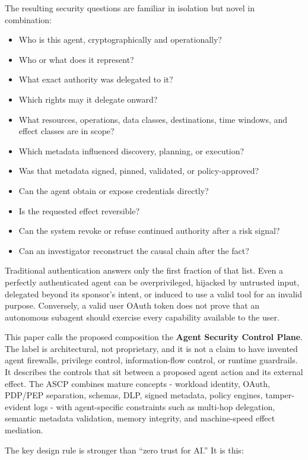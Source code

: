 \documentclass[
  10pt,
  letterpaper,
]{article}
\providecommand{\tightlist}{%
  \setlength{\itemsep}{0pt}\setlength{\parskip}{0pt}}
\begin{document}
The resulting security questions are familiar in isolation but novel in
combination:

\begin{itemize}
\tightlist
\item
  Who is this agent, cryptographically and operationally?
\item
  Who or what does it represent?
\item
  What exact authority was delegated to it?
\item
  Which rights may it delegate onward?
\item
  What resources, operations, data classes, destinations, time windows,
  and effect classes are in scope?
\item
  Which metadata influenced discovery, planning, or execution?
\item
  Was that metadata signed, pinned, validated, or policy-approved?
\item
  Can the agent obtain or expose credentials directly?
\item
  Is the requested effect reversible?
\item
  Can the system revoke or refuse continued authority after a risk
  signal?
\item
  Can an investigator reconstruct the causal chain after the fact?
\end{itemize}

Traditional authentication answers only the first fraction of that list.
Even a perfectly authenticated agent can be overprivileged, hijacked by
untrusted input, delegated beyond its sponsor's intent, or induced to
use a valid tool for an invalid purpose. Conversely, a valid user OAuth
token does not prove that an autonomous subagent should exercise every
capability available to the user.

This paper calls the proposed composition the \textbf{Agent Security
Control Plane}. The label is architectural, not proprietary, and it is
not a claim to have invented agent firewalls, privilege control,
information-flow control, or runtime guardrails. It describes the
controls that sit between a proposed agent action and its external
effect. The ASCP combines mature concepts - workload identity, OAuth,
PDP/PEP separation, schemas, DLP, signed metadata, policy engines,
tamper-evident logs - with agent-specific constraints such as multi-hop
delegation, semantic metadata validation, memory integrity, and
machine-speed effect mediation.

The key design rule is stronger than ``zero trust for AI.'' It is this:
\end{document}
